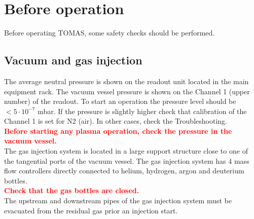 \documentclass[fleqn,a4paper,20pt]{article}
\begin{document}
\begin{minipage}{.68\textwidth}
	
\section{Before operation}%
	
	
Before operating TOMAS, some safety checks should be performed.

\subsection{Vacuum and gas injection}

The average neutral pressure is shown on the readout unit located in the main equipment rack.	The vacuum vessel pressure is shown on the Channel 1 (upper number) of the readout. To start an operation the pressure level should be $< 5\cdot 10^{-7}$ mbar. If the pressure is slightly higher check that calibration of the Channel 1 is set for N2 (air). In other cases, check the Troubleshooting.\\

\textcolor{red}{\textbf{Before starting any plasma operation, check the pressure in the vacuum vessel.}}\\

The gas injection system is located in a large support structure close to one of the tangential ports of the vacuum vessel. The gas injection system has 4 mass flow controllers directly connected to helium, hydrogen, argon and deuterium bottles.\\

\textcolor{red}{\textbf{Check that the gas bottles are closed.}}\\

The upstream and downstream pipes of the gas injection system must be evacuated from the residual gas prior an injection start.
\end{minipage}
\begin{minipage}{.02\textwidth}
	$\ $\\
\end{minipage}
\end{document}
